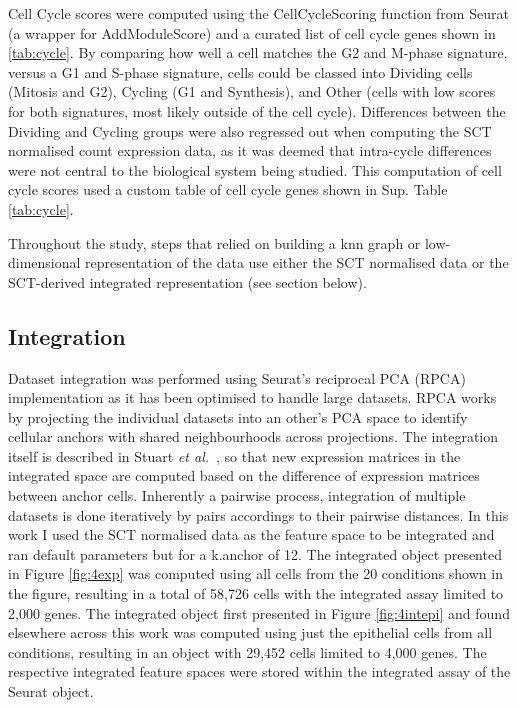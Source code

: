 Cell Cycle scores were computed using the CellCycleScoring function from Seurat (a wrapper for AddModuleScore) and a curated list of cell cycle genes shown in \ref{tab:cycle}. By comparing how well a cell matches the G2 and M-phase signature, versus a G1 and S-phase signature, cells could be classed into Dividing cells (Mitosis and G2), Cycling (G1 and Synthesis), and Other (cells with low scores for both signatures, most likely outside of the cell cycle). Differences between the Dividing and Cycling groups were also regressed out when computing the SCT normalised count expression data, as it was deemed that intra-cycle differences were not central to the biological system being studied. This computation of cell cycle scores used a custom table of cell cycle genes shown in Sup. Table \ref{tab:cycle}.

Throughout the study, steps that relied on building a \acrshort{knn} graph or low-dimensional representation of the data use either the SCT normalised data or the SCT-derived integrated representation (see section below).

\subsection{Integration}

Dataset integration was performed using Seurat's reciprocal PCA (RPCA) implementation \cite{hao_integrated_2021} as it has been optimised to handle large datasets. RPCA works by projecting the individual datasets into an other's PCA space to identify cellular anchors with shared neighbourhoods across projections. The integration itself is described in Stuart \emph{et al.}~\cite{stuart_integrative_2019}, so that new expression matrices in the integrated space are computed based on the difference of expression matrices between anchor cells. Inherently a pairwise process, integration of multiple datasets is done iteratively by pairs accordings to their pairwise distances. In this work I used the SCT normalised data as the feature space to be integrated and ran default parameters but for a k.anchor of 12.
The integrated object presented in Figure \ref{fig:4exp} was computed using all cells from the 20 conditions shown in the figure, resulting in a total of 58,726 cells with the integrated assay limited to 2,000 genes. The integrated object first presented in Figure \ref{fig:4intepi} and found elsewhere across this work was computed using just the epithelial cells from all conditions, resulting in an object with 29,452 cells limited to 4,000 genes. The respective integrated feature spaces were stored within the integrated assay of the Seurat object.

